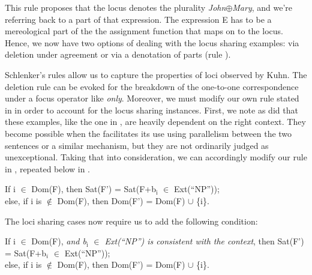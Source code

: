 \documentclass[output=paper,
modfonts
]{langscibook}
\begin{document}
This rule proposes that the locus denotes the plurality \textit{John}\(\oplus\)\textit{Mary}, and we're referring back to a part of that expression. The expression E has to be a mereological part of the the assignment function that maps on to the locus. Hence, we now have two options of dealing with the locus sharing examples: via deletion under agreement  or via a denotation of parts (rule ). 

Schlenker's rules allow us to capture the properties of loci observed by Kuhn. The deletion rule can be evoked for the breakdown of the one-to-one correspondence under a focus operator like \textit{only}. Moreover, we must modify our own rule stated in  in order to account for the locus sharing instances. First, we note as \citeauthor{Kuhn2015} did that these examples, like the one in , are heavily dependent on the right context. They become possible when the  facilitates its use using parallelism between the two sentences or a similar mechanism, but they are not ordinarily judged as unexceptional. Taking that into consideration, we can accordingly modify our rule in , repeated below in . 

\begin{exe}
	\ex \label{ex:irani:79} If i \(\in\) Dom(F), then Sat(F') = Sat(F+b$_\text{i}$ \(\in\) Ext(``NP''));\\ else, if i is \(\notin\) Dom(F), then Dom(F') = Dom(F) \(\cup\) \{i\}. 
\end{exe}

The loci sharing cases now require us to add the following condition: 

\begin{exe}
	\ex \label{ex:irani:80} If i \(\in\) Dom(F), \textit{and b$_\text{i}$ \(\in\) Ext(``NP'') is consistent with the context}, then Sat(F') = Sat(F+b$_i$ \(\in\) Ext(``NP''));\\ 
	else, if i is \(\notin\) Dom(F), then Dom(F') = Dom(F) \(\cup\) \{i\}. \par  
\end{exe}
\end{document}
